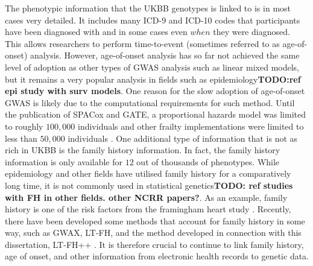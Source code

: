 The phenotypic information that the UKBB genotypes is linked to is in most cases very detailed. It includes many ICD-9 and ICD-10 codes that participants have been diagnosed with and in some cases even $ when $ they were diagnosed. This allows researchers to perform time-to-event (sometimes referred to as age-of-onset) analysis. However, age-of-onset analysis has so far not achieved the same level of adoption as other types of GWAS analysis such as linear mixed models, but it remains a very popular analysis in fields such as epidemiology\textbf{TODO:ref epi study with surv models}. One reason for the slow adoption of age-of-onset GWAS is likely due to the  computational requirements for such method. Until the publication of SPACox\cite{bi2020fast} and GATE\cite{dey2022efficient}, a proportional hazards model was limited to roughly $ 100,000 $ individuals and other frailty implementations were limited to less than $ 50,000 $ individuals \cite{rizvi2019gwasurvivr,syed2017survivalgwas_sv,he2020fast}. One additional type of information that is not as rich in UKBB is the family history information. In fact, the family history information is only available for $ 12 $ out of thousands of phenotypes. While epidemiology and other fields have utilised family history for a comparatively long time, it is not commonly used in statistical genetics\textbf{TODO: ref studies with FH in other fields. other NCRR papers?}. As an example, family history is one of the risk factors from the framingham heart study \cite{splansky2007third,kannel1990contribution}. Recently, there have been developed some methods that account for family history in some way, such as GWAX, LT-FH, and the method developed in connection with this dissertation, LT-FH++ \cite{gwax,hujoel2020liability,pedersen2022accounting}. It is therefore crucial to continue to link family history, age of onset, and other information from electronic health records to genetic data. 
